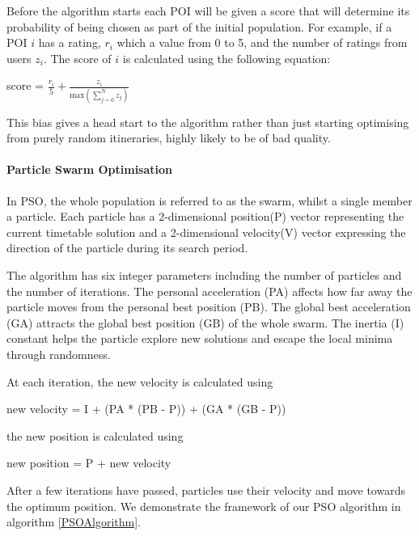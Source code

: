 Before the algorithm starts each POI will be given a score 
that will determine its probability of being chosen as
part of the initial population. For example, if a
POI $i$ has a rating, 
$r_i$ which a value from 0 to 5, and
the number of ratings from users $z_i$. The score of $i$
is calculated using the following equation:

    \begin{center}
        score = $\frac{r_i}{5}+\frac{z_i}{\text{max}(\sum_{j=0}^{N}{z_j})}$

    \end{center}

This bias gives a head start to the algorithm
rather than just starting optimising from purely
random itineraries, highly likely to be of bad
quality.




\paragraph{Particle Swarm Optimisation}

In PSO, the whole population is referred to as the
swarm, whilst a single member a particle. Each
particle has a 2-dimensional position(P) vector
representing the current timetable solution and a
2-dimensional velocity(V) vector expressing the direction
of the particle during its search period. 

The algorithm has six integer parameters including the
number of particles and the number of iterations. The
personal acceleration (PA) affects how far away the
particle moves from the personal best position (PB). 
The global best acceleration (GA) attracts the global
best position (GB) of the whole swarm. 
The inertia (I) constant helps the particle
explore new solutions and escape the local minima
through randomness. 

At each
iteration, the new velocity is calculated using
\begin{center}
    new velocity = I + (PA * (PB - P)) + (GA * (GB - P))
\end{center}

the new position is calculated using
\begin{center}
    new position = P + new velocity 
\end{center}

After a few iterations have passed, particles use
their velocity and move towards the optimum position.
We demonstrate the framework of our PSO algorithm in
algorithm \ref{PSOAlgorithm}.


